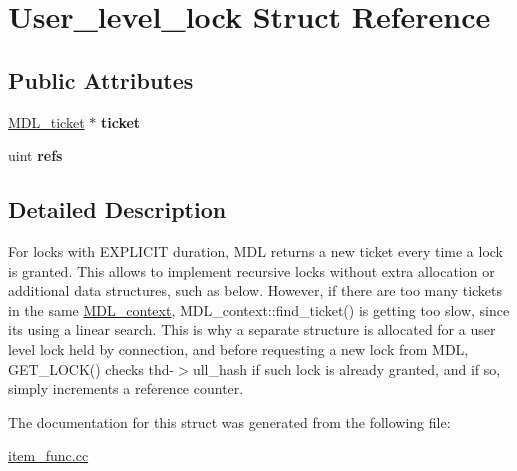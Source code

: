 \hypertarget{structUser__level__lock}{}\section{User\+\_\+level\+\_\+lock Struct Reference}
\label{structUser__level__lock}
\subsection*{Public Attributes}
\begin{DoxyCompactItemize}
\item 
\mbox{\label{structUser__level__lock_a33c1597c5a377feddbf2ea07ca40fed3}} 
\mbox{\hyperlink{classMDL__ticket}{M\+D\+L\+\_\+ticket}} $\ast$ {\bfseries ticket}
\item 
\mbox{\label{structUser__level__lock_a56dbecf5d5d2523c03ace9910121332a}} 
uint {\bfseries refs}
\end{DoxyCompactItemize}


\subsection{Detailed Description}
For locks with E\+X\+P\+L\+I\+C\+IT duration, M\+DL returns a new ticket every time a lock is granted. This allows to implement recursive locks without extra allocation or additional data structures, such as below. However, if there are too many tickets in the same \mbox{\hyperlink{classMDL__context}{M\+D\+L\+\_\+context}}, M\+D\+L\+\_\+context\+::find\+\_\+ticket() is getting too slow, since it\textquotesingle{}s using a linear search. This is why a separate structure is allocated for a user level lock held by connection, and before requesting a new lock from M\+DL, G\+E\+T\+\_\+\+L\+O\+C\+K() checks thd-\/$>$ull\+\_\+hash if such lock is already granted, and if so, simply increments a reference counter. 

The documentation for this struct was generated from the following file\+:\begin{DoxyCompactItemize}
\item 
\mbox{\hyperlink{item__func_8cc}{item\+\_\+func.\+cc}}\end{DoxyCompactItemize}
